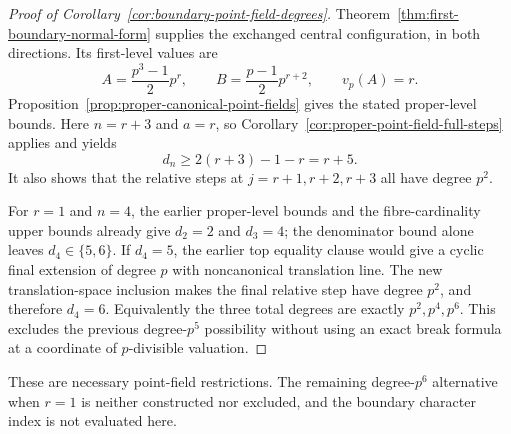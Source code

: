 \begin{proof}[Proof of Corollary~\ref{cor:boundary-point-field-degrees}]
Theorem~\ref{thm:first-boundary-normal-form} supplies the exchanged
central configuration, in both directions. Its first-level values are
\[
 A=\frac{p^3-1}{2}p^r,\qquad
 B=\frac{p-1}{2}p^{r+2},\qquad v_p(A)=r.
\]
Proposition~\ref{prop:proper-canonical-point-fields} gives the
stated proper-level bounds. Here $n=r+3$ and $a=r$, so
Corollary~\ref{cor:proper-point-field-full-steps} applies and yields
\[
 d_n\ge2(r+3)-1-r=r+5.
\]
It also shows that the relative steps at $j=r+1,r+2,r+3$ all
have degree $p^2$.

For $r=1$ and $n=4$, the earlier proper-level bounds and the
fibre-cardinality upper bounds already give $d_2=2$ and $d_3=4$;
the denominator bound alone leaves $d_4\in\{5,6\}$. If $d_4=5$,
the earlier top equality clause would give a cyclic final extension
of degree $p$ with noncanonical translation line. The new
translation-space inclusion makes the final relative step have
degree $p^2$, and therefore $d_4=6$. Equivalently the three total
degrees are exactly $p^2,p^4,p^6$. This excludes the previous
degree-$p^5$ possibility without using an exact break formula
at a coordinate of $p$-divisible valuation.
\end{proof}

These are necessary point-field restrictions. The remaining
degree-$p^6$ alternative when $r=1$ is neither constructed nor
excluded, and the boundary character index is not evaluated here.
